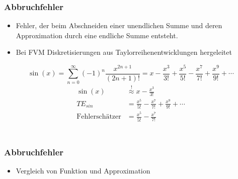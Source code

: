 \documentclass[accentcolor=tud2c,colorbacktitle,inverttitle,landscape,ngerman,presentation,t]{tudbeamer}
\begin{document}
\begin{frame}
  \frametitle{\\Abbruchfehler}
       \begin{itemize}
      \item  Fehler, der beim Abschneiden einer unendlichen Summe und deren Approximation durch
  eine endliche Summe entsteht.
      \item Bei FVM Diskretisierungen aus Taylorreihenentwicklungen hergeleitet
    \end{itemize}

      \begin{equation*}
  \sin(x) = \sum_{n=0}^{\infty}(-1)^n \frac{x^{2n+1}}{(2n+1)!} = 
  x-\frac{x^3}{3!} +\frac{x^5}{5!} -\frac{x^7}{7!} +\frac{x^9}{9!}+\cdots
 \label{eq:taylor_example}
\end{equation*}
\pause
\begin{align*}
  \sin(x) &\overset{!}{\approx} x-\frac{x^3}{3!}\\
  TE_{sin} &=  \frac{x^5}{5!} -\frac{x^7}{7!} +\frac{x^9}{9!}+\cdots\\
  \text{Fehlerschätzer} &=  \frac{x^5}{5!} -\frac{x^7}{7!}
\end{align*}
\end{frame}


\begin{frame}
  \frametitle{\\Abbruchfehler}
  \begin{itemize}
    \item Vergleich von Funktion und Approximation
  \end{itemize}
\begin{figure}[h]
\centering
 \label{fig:taylor_example}
\end{figure}
\end{frame}
\end{document}
